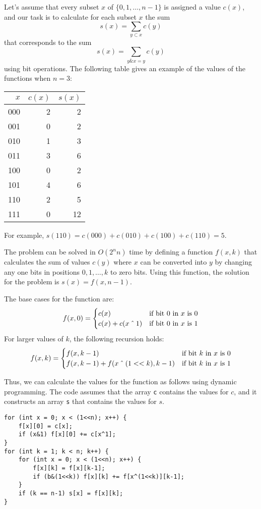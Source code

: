 Let's assume that every subset $x$
of $\{0,1,\ldots,n-1\}$
is assigned a value $c(x)$,
and our task is to calculate for
each subset $x$ the sum
\[s(x)=\sum_{y \subset x} c(y)\]
that corresponds to the sum
\[s(x)=\sum_{y \& x = y} c(y)\]
using bit operations.
The following table gives an example of
the values of the functions when $n=3$:
\begin{center}
\begin{tabular}{rrr}
$x$ & $c(x)$ & $s(x)$ \\
\hline
000 & 2 & 2 \\
001 & 0 & 2 \\
010 & 1 & 3 \\
011 & 3 & 6 \\
100 & 0 & 2 \\
101 & 4 & 6 \\
110 & 2 & 5 \\
111 & 0 & 12 \\
\end{tabular}
\end{center}
For example, $s(110)=c(000)+c(010)+c(100)+c(110)=5$. 

The problem can be solved in $O(2^n n)$ time
by defining a function $f(x,k)$ that calculates
the sum of values $c(y)$ where $x$ can be
converted into $y$ by changing any one bits
in positions $0,1,\ldots,k$ to zero bits.
Using this function, the solution for the
problem is $s(x)=f(x,n-1)$.

The base cases for the function are:
\begin{equation*}
    f(x,0) = \begin{cases}
               c(x)          & \textrm{if bit 0 in $x$ is 0}\\
               c(x)+c(x \XOR 1) & \textrm{if bit 0 in $x$ is 1}\\
           \end{cases}
\end{equation*}
For larger values of $k$, the following recursion holds:
\begin{equation*}
    f(x,k) = \begin{cases}
               f(x,k-1)          & \textrm{if bit $k$ in $x$ is 0}\\
               f(x,k-1)+f(x \XOR (1 < < k),k-1)    & \textrm{if bit $k$ in $x$ is 1}\\
           \end{cases}
\end{equation*}

Thus, we can calculate the values for the function
as follows using dynamic programming.
The code assumes that the array \texttt{c}
contains the values for $c$,
and it constructs an array \texttt{s}
that contains the values for $s$.
\begin{lstlisting}
for (int x = 0; x < (1<<n); x++) {
    f[x][0] = c[x];
    if (x&1) f[x][0] += c[x^1];
}
for (int k = 1; k < n; k++) {
    for (int x = 0; x < (1<<n); x++) {
        f[x][k] = f[x][k-1];
        if (b&(1<<k)) f[x][k] += f[x^(1<<k)][k-1];
    }
    if (k == n-1) s[x] = f[x][k];
}
\end{lstlisting}

